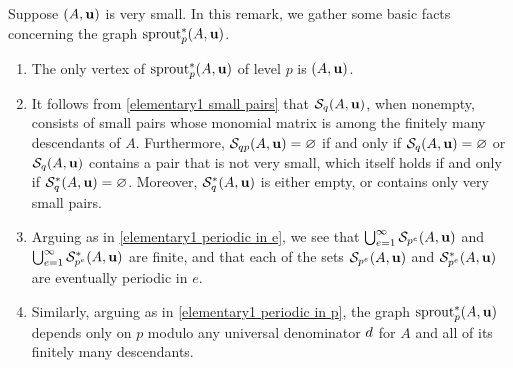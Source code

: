 \documentclass{amsart}
\begin{document}
\begin{remark}
   \label{elementary2: R}
   Suppose $(A,\mathbf{u})$ is very small.
   In this remark, we gather some basic facts concerning the graph $\operatorname{sprout}^{\ast}_p(A,\mathbf{u})$.
   \begin{enumerate}
      \item  \label{elementary2 lowest level}
      The only vertex of $\operatorname{sprout}_p^{\ast}(A,\mathbf{u})$ of level $p$ is $(A,\mathbf{u})$.
      \item \label{elementary2 small pairs}
      It follows from \eqref{elementary1 small pairs} that $\mathcal{S}_{q}(A,\mathbf{u})$, when nonempty, consists of small pairs whose monomial matrix is among the finitely many descendants of $A$.
      Furthermore, $\mathcal{S}_{qp}(A,\mathbf{u}) = \varnothing$ if and only if $\mathcal{S}_q(A,\mathbf{u}) = \varnothing$ or $\mathcal{S}_q(A,\mathbf{u})$ contains a pair that is not very small, which itself holds if and only if $\mathcal{S}_{q}^{\ast}(A,\mathbf{u})= \varnothing$.
      Moreover, $\mathcal{S}_q^{\ast}(A,\mathbf{u})$ is either empty, or contains only very small pairs.
      \item \label{elementary2 periodic in e}
      Arguing as in \eqref{elementary1 periodic in e}, we see that $\bigcup_{e=1}^{\infty} \mathcal{S}_{p^e}(A,\mathbf{u})$ and  $\bigcup_{e=1}^{\infty} \mathcal{S}^{\ast}_{p^e}(A,\mathbf{u})$ are finite, and that each of the sets $\mathcal{S}_{p^e}(A,\mathbf{u})$ and $\mathcal{S}^{\ast}_{p^e}(A,\mathbf{u})$ are eventually periodic in $e$.
      \item \label{elementary2 periodic in p}
      Similarly, arguing as in \eqref{elementary1 periodic in p}, the graph $\operatorname{sprout}_p^{\ast}(A,\mathbf{u})$ depends only on $p$ modulo any universal denominator $d$ for $A$  and all of its finitely many descendants.
   \end{enumerate}
\end{remark}
\end{document}
